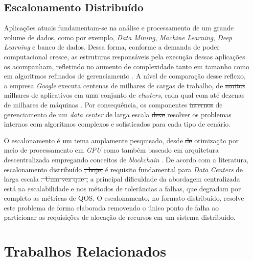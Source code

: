 \documentclass[
	12pt,				%
	openright,			%
	oneside,			%
	a4paper,			%
	brazil				%
	]{abntex2}
\providecommand{\DIFaddtex}[1]{{\protect\color{blue}\uwave{#1}}} %
\providecommand{\DIFdeltex}[1]{{\protect\color{red}\sout{#1}}}                      %
\providecommand{\DIFaddbegin}{} %
\providecommand{\DIFaddend}{} %
\providecommand{\DIFdelbegin}{} %
\providecommand{\DIFdelend}{} %
\providecommand{\DIFadd}[1]{\texorpdfstring{\DIFaddtex{#1}}{#1}} %
\providecommand{\DIFdel}[1]{\texorpdfstring{\DIFdeltex{#1}}{}} %
\newcommand{\DIFscaledelfig}{0.5}
\newlength{\DIFdelgraphicswidth} %
\newlength{\DIFdelgraphicsheight} %
\newcommand{\DIFaddincludegraphics}[2][]{{\color{blue}\fbox{\DIFOincludegraphics[#1]{#2}}}} %
\newcommand{\DIFdelincludegraphics}[2][]{%
\sbox{\DIFdelgraphicsbox}{\DIFOincludegraphics[#1]{#2}}%
\settoboxwidth{\DIFdelgraphicswidth}{\DIFdelgraphicsbox} %
\settoboxtotalheight{\DIFdelgraphicsheight}{\DIFdelgraphicsbox} %
\scalebox{\DIFscaledelfig}{%
\parbox[b]{\DIFdelgraphicswidth}{\usebox{\DIFdelgraphicsbox}\\[-\baselineskip] \rule{\DIFdelgraphicswidth}{0em}}\llap{\resizebox{\DIFdelgraphicswidth}{\DIFdelgraphicsheight}{%
\setlength{\unitlength}{\DIFdelgraphicswidth}%
\begin{picture}(1,1)%
\thicklines\linethickness{2pt} %
{\color[rgb]{1,0,0}\put(0,0){\framebox(1,1){}}}%
{\color[rgb]{1,0,0}\put(0,0){\line( 1,1){1}}}%
{\color[rgb]{1,0,0}\put(0,1){\line(1,-1){1}}}%
\end{picture}%
}\hspace*{3pt}}} %
} %
\DeclareRobustCommand{\DIFaddbegin}{\DIFOaddbegin \let\includegraphics\DIFaddincludegraphics} %
\DeclareRobustCommand{\DIFaddend}{\DIFOaddend \let\includegraphics\DIFOincludegraphics} %
\DeclareRobustCommand{\DIFdelbegin}{\DIFOdelbegin \let\includegraphics\DIFdelincludegraphics} %
\DeclareRobustCommand{\DIFdelend}{\DIFOaddend \let\includegraphics\DIFOincludegraphics} %
\begin{document}
\subsection{Escalonamento Distribuído}

Aplicações atuais fundamentam-se na análise e processamento de um grande volume de dados, como por exemplo, \textit{Data Mining}, \textit{Machine Learning}, \textit{Deep Learning} e banco de dados. Dessa forma, conforme a demanda de poder computacional cresce, as estruturas responsáveis pela execução dessas aplicações os acompanham, refletindo no aumento de complexidade tanto em tamanho como em algoritmos refinados de gerenciamento \cite{Wang2016LoadbalancedAL}. A nível de comparação desse reflexo, a empresa \textit{Google} executa centenas de milhares de cargas de trabalho, de \DIFdelbegin \DIFdel{muitos }\DIFdelend milhares de aplicativos em \DIFdelbegin \DIFdel{uma }\DIFdelend \DIFaddbegin \DIFadd{um }\DIFaddend conjunto de \textit{clusters}, cada qual com até dezenas de milhares de máquinas \cite{Google2015Borg}. 
Por consequência, os componentes \DIFdelbegin \DIFdel{internos }\DIFdelend de gerenciamento de um \textit{data center} de larga escala \DIFdelbegin \DIFdel{deve }\DIFdelend \DIFaddbegin \DIFadd{devem }\DIFaddend resolver os problemas internos com algoritmos complexos e sofisticados para cada tipo de cenário.

O escalonamento é um tema amplamente pesquisado, desde \DIFdelbegin \DIFdel{de }\DIFdelend otimização por meio de processamento em \textit{GPU} \cite{Nesi2018ScheduleGPU} como também baseado em arquitetura descentralizada empregando conceitos de \textit{blockchain} \cite{loch2021novel}. De acordo com a literatura, \DIFaddbegin \DIFadd{o }\DIFaddend escalonamento distribuído \DIFdelbegin \DIFdel{, hoje, }\DIFdelend é requisito fundamental para \textit{Data Centers} de larga escala \cite{Google2015Borg, Wang2019Pigeon}\DIFdelbegin \DIFdel{. Uma vez que , }\DIFdelend \DIFaddbegin \DIFadd{, uma vez que }\DIFaddend a principal dificuldade da abordagem centralizada está na escalabilidade e nos métodos de tolerâncias a falhas, que degradam por completo as métricas de \ac{QOS}. O escalonamento, no formato distribuído, resolve este problema de forma elaborada removendo o único ponto de falha ao particionar as requisições de alocação de recursos em um sistema distribuído.

\section{Trabalhos Relacionados}
\end{document}
